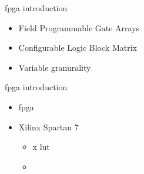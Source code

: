 \begin{frame}{\acrshort{fpga} introduction}
    \begin{itemize}
        \item Field Programmable Gate Arrays
        \item Configurable Logic Block Matrix
        \item Variable granurality
        
    \end{itemize}
\end{frame}


\begin{frame}{\acrshort{fpga} introduction}
    \begin{itemize}
        \item \acrfull{fpga}
        \item Xilinx Spartan 7 \cite{sp701} \cite{fpga_resources}
            \begin{itemize}
                \item x \gls{lut}
                \item {}
            \end{itemize}
    \end{itemize}
\end{frame}

